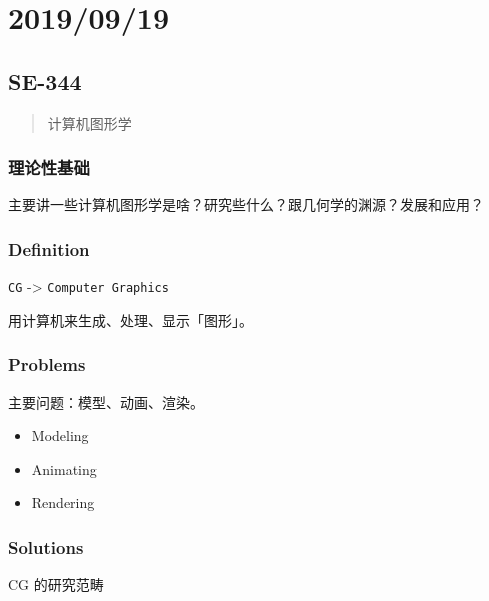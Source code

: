 \documentclass[
]{article}
\date{}
\begin{document}
\hypertarget{header-n0}{%
\section{2019/09/19}\label{header-n0}}

\hypertarget{header-n2}{%
\subsection{SE-344}\label{header-n2}}

\begin{quote}
计算机图形学
\end{quote}

\hypertarget{header-n5}{%
\subsubsection{理论性基础}\label{header-n5}}

主要讲一些计算机图形学是啥？研究些什么？跟几何学的渊源？发展和应用？

\hypertarget{header-n7}{%
\subsubsection{Definition}\label{header-n7}}

\texttt{CG} -\textgreater{} \texttt{Computer\ Graphics}

用计算机来生成、处理、显示「图形」。

\hypertarget{header-n10}{%
\subsubsection{Problems}\label{header-n10}}

主要问题：模型、动画、渲染。

\begin{itemize}
\item
  Modeling
\item
  Animating
\item
  Rendering
\end{itemize}

\hypertarget{header-n19}{%
\subsubsection{Solutions}\label{header-n19}}

CG 的研究范畴
\end{document}
